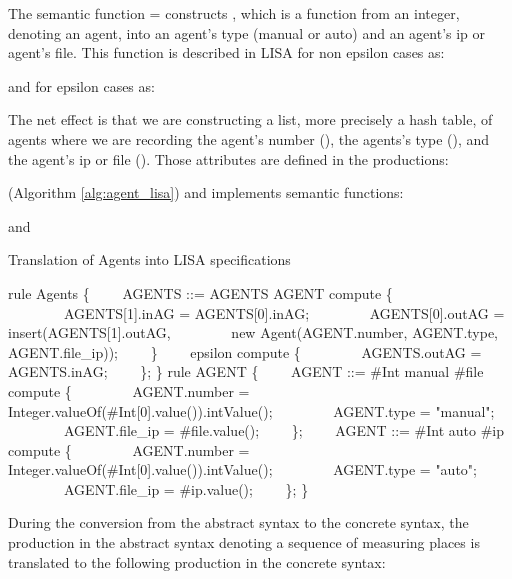 \documentclass[preprint, prX]{revtex4}
\begin{document}
\normalsize
The semantic function  = 
constructs , which is a function from an integer, denoting an agent, into an agent's type (manual or auto) and an agent's ip or agent's file. This function is described in LISA for non epsilon cases as:
\footnotesize



\normalsize
and for epsilon cases as:
\footnotesize

\normalsize
The net effect is that we are constructing a list, more precisely a hash table, of agents where we are recording the agent's number (), the agents's type (), and the agent's ip or file (). Those attributes are defined
in the productions:
\footnotesize

\normalsize
(Algorithm \ref{alg:agent_lisa}) and implements semantic functions:
\footnotesize

\normalsize
and
\footnotesize

\normalsize

\begin{algorithm}[tbh]
\caption{Translation of Agents into LISA specifications}
\label{alg:agent_lisa}
\footnotesize
\begin{algorithmic}[1]
\STATE rule Agents \{
\STATE \ \ \ \ AGENTS ::= AGENTS  AGENT compute \{
\STATE \ \ \ \ \ \ \ \ AGENTS[1].inAG = AGENTS[0].inAG;
\STATE \ \ \ \ \ \ \ \ AGENTS[0].outAG = insert(AGENTS[1].outAG,
\STATE \ \ \ \ \ \ \ \ new Agent(AGENT.number, AGENT.type, AGENT.file\_ip));
\STATE \ \ \ \ \}
\STATE \ \ \ \  epsilon compute \{
\STATE \ \ \ \ \ \ \ \ AGENTS.outAG = AGENTS.inAG;
\STATE \ \ \ \ \};
\STATE \}
\STATE rule AGENT \{
\STATE \ \ \ \ AGENT ::= \#Int manual \#file \; compute \{
\STATE \ \ \ \ \ \ \ \ AGENT.number = Integer.valueOf(\#Int[0].value()).intValue();
\STATE \ \ \ \ \ \ \ \ AGENT.type = "manual";
\STATE \ \ \ \ \ \ \ \ AGENT.file\_ip = \#file.value();
\STATE \ \ \ \ \};
\STATE \ \ \ \ AGENT ::= \#Int auto \#ip \; compute \{
\STATE \ \ \ \ \ \ \ \ AGENT.number = Integer.valueOf(\#Int[0].value()).intValue();
\STATE \ \ \ \ \ \ \ \ AGENT.type = "auto";
\STATE \ \ \ \ \ \ \ \ AGENT.file\_ip = \#ip.value();
\STATE \ \ \ \ \};
\STATE \}
\end{algorithmic}
\normalsize
\end{algorithm}

During the conversion from the abstract syntax to the concrete syntax, the production in the abstract syntax 
denoting a sequence of measuring places is translated to the following production
in the concrete syntax:
\footnotesize
\end{document}
